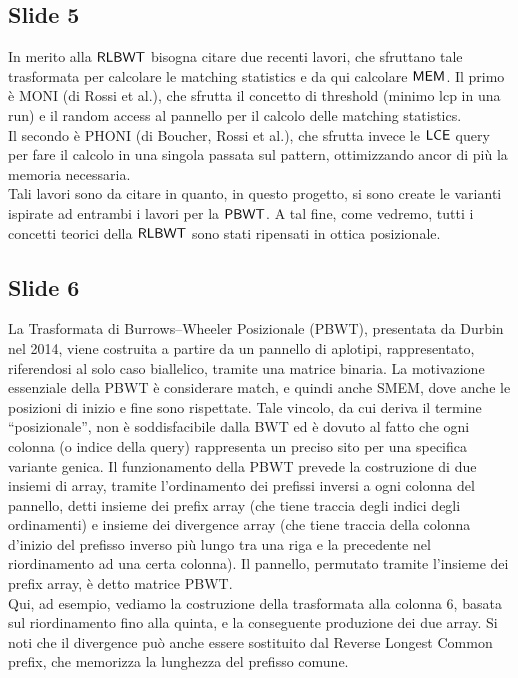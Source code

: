 \documentclass[a4paper,11pt, oneside,italian]{article}
\def\LCE{\mbox{\rm {\sf LCE}}}
\def\RLBWT{\mbox{\rm {\sf RLBWT}}}
\def\MEM{\mbox{\rm {\sf MEM}}}
\def\PBWT{\mbox{\rm {\sf PBWT}}}
\def\LCE{\mbox{\rm {\sf LCE}}}
\begin{document}
\subsection*{Slide 5}
In merito alla $\RLBWT$ bisogna citare due recenti lavori, che sfruttano tale
trasformata per calcolare le matching statistics e da qui calcolare $\MEM$.
Il primo è MONI (di Rossi et al.), che sfrutta il concetto di threshold (minimo
lcp in una run) e il random access al pannello per il calcolo delle matching
statistics. \\
Il secondo è PHONI (di Boucher, Rossi et al.), che sfrutta invece le $\LCE$
query per fare il calcolo in una singola passata sul pattern, ottimizzando ancor
di più la memoria necessaria.\\
Tali lavori sono da citare in quanto, in questo progetto, si sono create le
varianti ispirate ad entrambi i lavori per la $\PBWT$. A tal fine, come
vedremo, tutti i concetti teorici della $\RLBWT$ sono stati ripensati in ottica
posizionale.
\subsection*{Slide 6}
La Trasformata di Burrows–Wheeler Posizionale (PBWT), presentata da Durbin nel
2014, viene costruita a partire 
da un pannello di aplotipi, rappresentato, riferendosi al solo caso biallelico,
tramite una matrice binaria. La motivazione essenziale della PBWT è considerare
match, e quindi anche SMEM, dove anche le posizioni di inizio e fine sono
rispettate. Tale vincolo, da cui deriva il termine “posizionale”, non è
soddisfacibile dalla BWT ed è dovuto al fatto che ogni colonna (o indice della
query) rappresenta un preciso sito per una specifica variante genica.
Il funzionamento della PBWT prevede la costruzione di due insiemi di array,
tramite l’ordinamento dei prefissi inversi a ogni colonna del pannello, detti
insieme dei prefix array (che tiene traccia degli indici degli ordinamenti) e
insieme dei divergence array (che tiene traccia della colonna d'inizio del
prefisso inverso più lungo tra una riga e la precedente nel riordinamento ad una
certa colonna). Il pannello, permutato  
tramite l’insieme dei prefix array, è detto matrice PBWT. \\
Qui, ad esempio, vediamo la costruzione della trasformata alla colonna 6, basata
sul riordinamento fino alla quinta, e la conseguente produzione dei due array.
Si noti che il divergence può anche essere sostituito dal Reverse Longest Common
prefix, che memorizza la lunghezza del prefisso comune.
\end{document}
